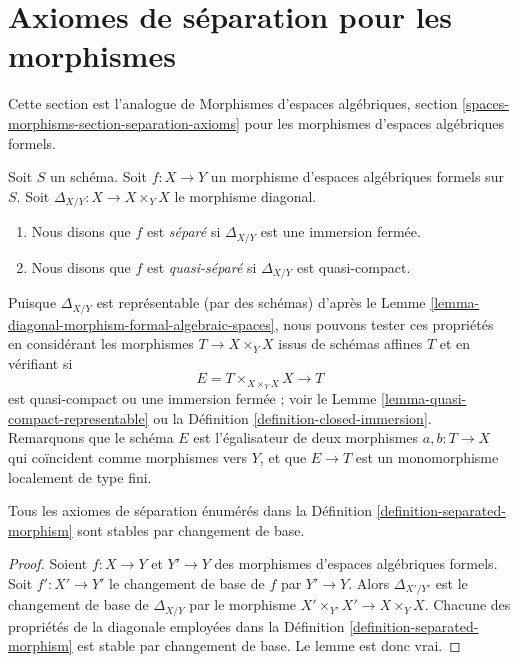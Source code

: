 \section{Axiomes de séparation pour les morphismes}
\label{section-separation-axioms}

\noindent
Cette section est l'analogue de
Morphismes d'espaces algébriques, section \ref{spaces-morphisms-section-separation-axioms}
pour les morphismes d'espaces algébriques formels.

\begin{definition}
\label{definition-separated-morphism}
Soit $S$ un schéma.
Soit $f : X \to Y$ un morphisme d'espaces algébriques formels sur $S$.
Soit $\Delta_{X/Y} : X \to X \times_Y X$ le morphisme diagonal.
\begin{enumerate}
\item Nous disons que $f$ est {\it séparé} si $\Delta_{X/Y}$ est une immersion fermée.
\item Nous disons que $f$ est {\it quasi-séparé} si $\Delta_{X/Y}$ est quasi-compact.
\end{enumerate}
\end{definition}

\noindent
Puisque $\Delta_{X/Y}$ est représentable (par des schémas) d'après le
Lemme \ref{lemma-diagonal-morphism-formal-algebraic-spaces},
nous pouvons tester ces propriétés en considérant les morphismes $T \to X \times_Y X$
issus de schémas affines $T$ et en vérifiant si
$$
E = T \times_{X \times_Y X} X \longrightarrow T
$$
est quasi-compact ou une immersion fermée ; voir le
Lemme \ref{lemma-quasi-compact-representable} ou la
Définition \ref{definition-closed-immersion}.
Remarquons que le schéma $E$ est l'égalisateur de deux morphismes
$a, b : T \to X$ qui coïncident comme morphismes vers $Y$,
et que $E \to T$ est un monomorphisme localement de type fini.

\begin{lemma}
\label{lemma-base-change-separated}
Tous les axiomes de séparation énumérés dans la
Définition \ref{definition-separated-morphism}
sont stables par changement de base.
\end{lemma}

\begin{proof}
Soient $f : X \to Y$ et $Y' \to Y$ des morphismes d'espaces algébriques formels.
Soit $f' : X' \to Y'$ le changement de base de $f$ par $Y' \to Y$. Alors
$\Delta_{X'/Y'}$ est le changement de base de $\Delta_{X/Y}$ par
le morphisme $X' \times_{Y'} X' \to X \times_Y X$. Chacune des propriétés
de la diagonale employées dans la Définition \ref{definition-separated-morphism}
est stable par changement de base. Le lemme est donc vrai.
\end{proof}

